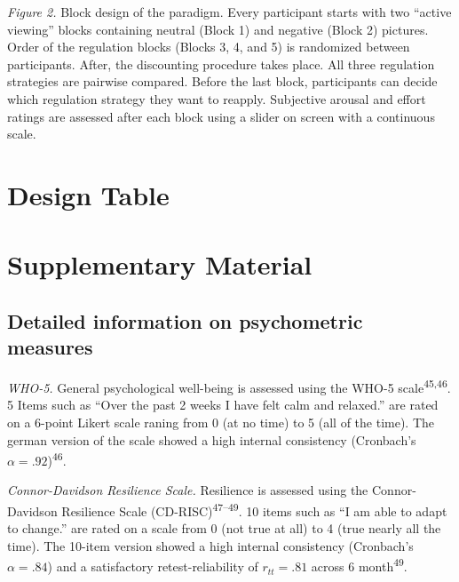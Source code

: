 \documentclass[
  man,floatsintext]{apa6}
\begin{document}
\emph{Figure 2.} Block design of the paradigm.
Every participant starts with two ``active viewing'' blocks containing neutral (Block 1) and negative (Block 2) pictures.
Order of the regulation blocks (Blocks 3, 4, and 5) is randomized between participants.
After, the discounting procedure takes place.
All three regulation strategies are pairwise compared.
Before the last block, participants can decide which regulation strategy they want to reapply.
Subjective arousal and effort ratings are assessed after each block using a slider on screen with a continuous scale.

\hypertarget{DesignTable}{%
\section{Design Table}\label{DesignTable}}



\newpage

\hypertarget{SupplementaryMaterial}{%
\section{Supplementary Material}\label{SupplementaryMaterial}}


\setcounter{section}{19}
\setcounter{figure}{0}
\setcounter{table}{1}
\newpage

\hypertarget{SupplementQuestionnaires}{%
\subsection{Detailed information on psychometric measures}\label{SupplementQuestionnaires}}

\emph{WHO-5.} General psychological well-being is assessed using the WHO-5 scale\textsuperscript{45,46}.
5 Items such as ``Over the past 2 weeks I have felt calm and relaxed.'' are rated on a 6-point Likert scale raning from 0 (at no time) to 5 (all of the time).
The german version of the scale showed a high internal consistency (Cronbach's \(\alpha=.92\))\textsuperscript{46}.

\emph{Connor-Davidson Resilience Scale.} Resilience is assessed using the Connor-Davidson Resilience Scale (CD-RISC)\textsuperscript{47--49}.
10 items such as ``I am able to adapt to change.'' are rated on a scale from 0 (not true at all) to 4 (true nearly all the time).
The 10-item version showed a high internal consistency (Cronbach's \(\alpha=.84\)) and a satisfactory retest-reliability of \(r_{tt}=.81\) across 6 month\textsuperscript{49}.
\end{document}
